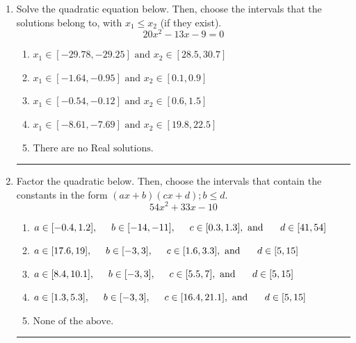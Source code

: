 \documentclass[14pt]{extbook}
\newcommand{\litem}[1]{\item#1\hspace*{-1cm}\rule{\textwidth}{0.4pt}}
\begin{document}
\begin{enumerate}
{\begin{enumerate}[label=\Alph*.]
\end{enumerate} }
\litem{
Solve the quadratic equation below. Then, choose the intervals that the solutions belong to, with $x_1 \leq x_2$ (if they exist).\[ 20x^{2} -13 x -9 = 0 \]\begin{enumerate}[label=\Alph*.]
\item \( x_1 \in [-29.78, -29.25] \text{ and } x_2 \in [28.5, 30.7] \)
\item \( x_1 \in [-1.64, -0.95] \text{ and } x_2 \in [0.1, 0.9] \)
\item \( x_1 \in [-0.54, -0.12] \text{ and } x_2 \in [0.6, 1.5] \)
\item \( x_1 \in [-8.61, -7.69] \text{ and } x_2 \in [19.8, 22.5] \)
\item \( \text{There are no Real solutions.} \)

\end{enumerate} }
\litem{
Factor the quadratic below. Then, choose the intervals that contain the constants in the form $(ax+b)(cx+d); b \leq d.$\[ 54x^{2} +33 x -10 \]\begin{enumerate}[label=\Alph*.]
\item \( a \in [-0.4, 1.2], \hspace*{5mm} b \in [-14, -11], \hspace*{5mm} c \in [0.3, 1.3], \text{ and } \hspace*{5mm} d \in [41, 54] \)
\item \( a \in [17.6, 19], \hspace*{5mm} b \in [-3, 3], \hspace*{5mm} c \in [1.6, 3.3], \text{ and } \hspace*{5mm} d \in [5, 15] \)
\item \( a \in [8.4, 10.1], \hspace*{5mm} b \in [-3, 3], \hspace*{5mm} c \in [5.5, 7], \text{ and } \hspace*{5mm} d \in [5, 15] \)
\item \( a \in [1.3, 5.3], \hspace*{5mm} b \in [-3, 3], \hspace*{5mm} c \in [16.4, 21.1], \text{ and } \hspace*{5mm} d \in [5, 15] \)
\item \( \text{None of the above.} \)


\end{enumerate}}
\end{enumerate}
\end{document}
